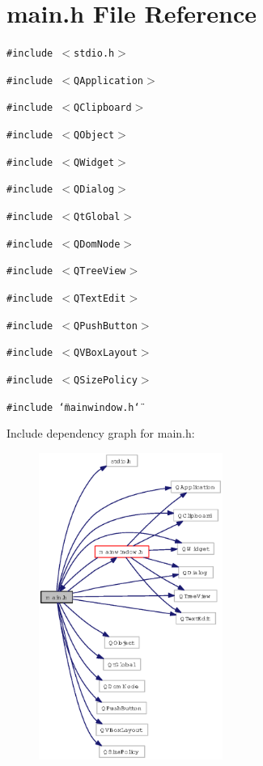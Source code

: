 \section{main.h File Reference}
\label{main_8h}
{\tt \#include $<$stdio.h$>$}\par
{\tt \#include $<$QApplication$>$}\par
{\tt \#include $<$QClipboard$>$}\par
{\tt \#include $<$QObject$>$}\par
{\tt \#include $<$QWidget$>$}\par
{\tt \#include $<$QDialog$>$}\par
{\tt \#include $<$Qt\-Global$>$}\par
{\tt \#include $<$QDom\-Node$>$}\par
{\tt \#include $<$QTree\-View$>$}\par
{\tt \#include $<$QText\-Edit$>$}\par
{\tt \#include $<$QPush\-Button$>$}\par
{\tt \#include $<$QVBox\-Layout$>$}\par
{\tt \#include $<$QSize\-Policy$>$}\par
{\tt \#include \char`\"{}mainwindow.h\char`\"{}}\par


Include dependency graph for main.h:\begin{figure}[H]
\begin{center}
\leavevmode
\includegraphics[width=170pt]{main_8h__incl}
\end{center}
\end{figure}


